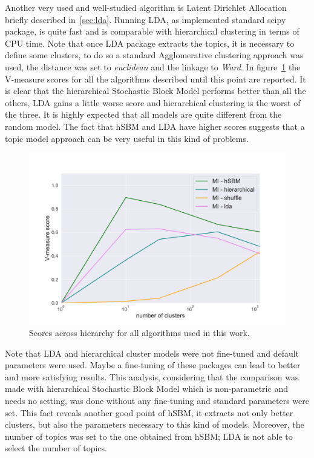 Another very used and well-studied algorithm is Latent Dirichlet Allocation briefly described in~\ref{sec:lda}. Running LDA, as implemented standard scipy package, is quite fast and is comparable with hierarchical clustering in terms of CPU time. Note that once LDA package extracts the topics, it is necessary to define some clusters, to do so a standard Agglomerative clustering approach was used, the distance was set to \textit{euclidean} and the linkage to \textit{Ward}. In figure~\ref{fig:topic/gtex/oversigma_10tissue/metric_scores_all} the V-measure scores for all the algorithms described until this point are reported. It is clear that the hierarchical Stochastic Block Model performs better than all the others, LDA gains a little worse score and hierarchical clustering is the worst of the three. It is highly expected that all models are quite different from the random model. The fact that hSBM and LDA have higher scores suggests that a topic model approach can be very useful in this kind of problems. 
\begin{figure}[htb!]
    \centering
    \includegraphics[width=0.9\linewidth]{pictures/topic/gtex/oversigma_10tissue/metric_scores_all.pdf}
    \caption{Scores across hierarchy for all algorithms used in this work.}
    \label{fig:topic/gtex/oversigma_10tissue/metric_scores_all}
\end{figure}
Note that LDA and hierarchical cluster models were not fine-tuned and default parameters were used. Maybe a fine-tuning of these packages can lead to better and more satisfying results. This analysis, considering that the comparison was made with hierarchical Stochastic Block Model which is non-parametric and needs no setting, was done without any fine-tuning and standard parameters were set. This fact reveals another good point of hSBM, it extracts not only better clusters, but also the parameters necessary to this kind of models. Moreover, the number of topics was set to the one obtained from hSBM; LDA is not able to select the number of topics.

